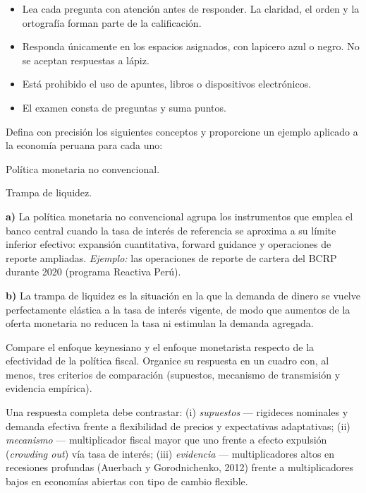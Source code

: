 \documentclass{evaluacion}
\begin{document}
\membrete

\begin{instrucciones}
\begin{itemize}
  \item Lea cada pregunta con atención antes de responder. La claridad,
        el orden y la ortografía forman parte de la calificación.
  \item Responda únicamente en los espacios asignados, con lapicero azul
        o negro. No se aceptan respuestas a lápiz.
  \item Está prohibido el uso de apuntes, libros o dispositivos electrónicos.
  \item El examen consta de \totalpreguntas{} preguntas y suma
        \totalpuntos{} puntos.
\end{itemize}
\end{instrucciones}


\begin{pregunta}[4]
Defina con precisión los siguientes conceptos y proporcione un ejemplo
aplicado a la economía peruana para cada uno:
\begin{apartados}
  \item Política monetaria no convencional. 
  \item Trampa de liquidez. 
\end{apartados}
\begin{solucion}
\textbf{a)} La política monetaria no convencional agrupa los instrumentos
que emplea el banco central cuando la tasa de interés de referencia se
aproxima a su límite inferior efectivo: expansión cuantitativa, forward
guidance y operaciones de reporte ampliadas. \emph{Ejemplo:} las
operaciones de reporte de cartera del BCRP durante 2020 (programa
Reactiva Perú).

\textbf{b)} La trampa de liquidez es la situación en la que la demanda de
dinero se vuelve perfectamente elástica a la tasa de interés vigente, de
modo que aumentos de la oferta monetaria no reducen la tasa ni estimulan
la demanda agregada.
\end{solucion}
\end{pregunta}

\begin{pregunta}[4]
Compare el enfoque keynesiano y el enfoque monetarista respecto de la
efectividad de la política fiscal. Organice su respuesta en un cuadro con,
al menos, tres criterios de comparación (supuestos, mecanismo de
transmisión y evidencia empírica).
\espaciorespuesta{7cm}
\begin{solucion}
Una respuesta completa debe contrastar: (i) \emph{supuestos} — rigideces
nominales y demanda efectiva frente a flexibilidad de precios y expectativas
adaptativas; (ii) \emph{mecanismo} — multiplicador fiscal mayor que uno
frente a efecto expulsión (\emph{crowding out}) vía tasa de interés;
(iii) \emph{evidencia} — multiplicadores altos en recesiones profundas
(Auerbach y Gorodnichenko, 2012) frente a multiplicadores bajos en
economías abiertas con tipo de cambio flexible.
\end{solucion}
\end{pregunta}
\end{document}
